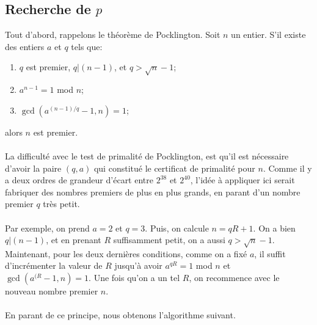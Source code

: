\documentclass{article}
\begin{document}
\subsection{Recherche de $p$}

Tout d'abord, rappelons le théorème de Pocklington. Soit $n$ un entier. S’il existe des entiers $a$ et $q$ tels que:
\begin{enumerate}
    \item $q$ est premier, $q |(n-1)$, et $q > \sqrt{n} - 1$;
    \item $a^{n-1} = 1$ mod $n$;
    \item $\operatorname{gcd}(a^{(n-1)/q} - 1, n) = 1$;
\end{enumerate}

alors $n$ est premier.\\ \\
La difficulté avec le test de primalité de Pocklington, est qu'il est nécessaire d'avoir la paire $(q, a)$ qui constitué le certificat de primalité pour $n$. Comme il y a deux ordres de grandeur d'écart entre $2^{38}$ et $2^{40}$, l'idée à appliquer ici serait fabriquer des nombres premiers de plus en plus grands, en parant d'un nombre premier $q$ très petit.\\ \\
Par exemple, on prend $a=2$ et $q=3$. Puis, on calcule $n = qR + 1$. On a bien $q |(n-1)$, et en prenant $R$ suffisamment petit, on a aussi $q > \sqrt{n} - 1$. Maintenant, pour les deux dernières conditions, comme on a fixé $a$, il suffit d'incrémenter la valeur de $R$ jusqu'à avoir $a^{qR} = 1$ mod $n$ et $\operatorname{gcd}(a^{(R} - 1, n) = 1$. Une fois qu'on a un tel $R$, on recommence avec le nouveau nombre premier $n$.\\ \\
En parant de ce principe, nous obtenons l'algorithme suivant.
\end{document}
